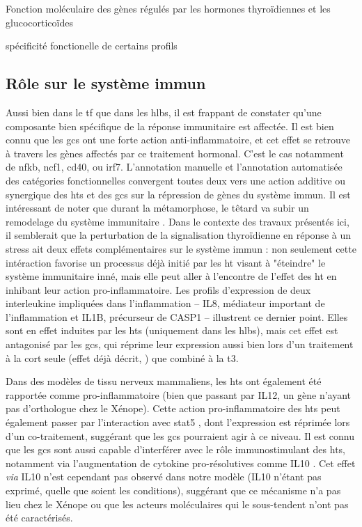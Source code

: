 \documentclass[../main.tex]{subfiles}
\begin{document}
\begin{chapter}{Fonction moléculaire des gènes régulés par les hormones thyroïdiennes et les glucocorticoïdes}
\begin{section}{spécificité fonctionelle de certains profils}
\subsection{Rôle sur le système immun}
Aussi bien dans le \gls{tf} que dans les \glspl{hlb}, il est frappant de constater qu'une composante bien spécifique de la réponse immunitaire est affectée.
Il est bien connu que les \glspl{gc} ont une forte action anti-inflammatoire, et cet effet se retrouve à travers les gènes affectés par ce traitement hormonal.
C'est le cas notamment de \gls{nfkb}, \gls{ncf1}, \gls{cd40}, ou \gls{irf7}.
L'annotation manuelle et l'annotation automatisée des catégories fonctionnelles convergent toutes deux vers une action additive ou synergique des \glspl{ht} et des \glspl{gc} sur la répression de gènes du système immun.
Il est intéressant de noter que durant la métamorphose, le têtard va subir un remodelage du système immunitaire .
Dans le contexte des travaux présentés ici, il semblerait que la perturbation de la signalisation thyroïdienne en réponse à un stress ait deux effets complémentaires sur le système immun :
non seulement cette intéraction favorise un processus déjà initié par les \gls{ht} visant à "éteindre" le système immunitaire inné, mais elle peut aller à l'encontre de l'effet des \gls{ht} en inhibant leur action pro-inflammatoire.
Les profils d'expression de deux interleukine impliquées dans l'inflammation – IL8, médiateur important de l'inflammation et IL1B, précurseur de CASP1 – illustrent ce dernier point.
Elles sont en effet induites par les \glspl{ht} (uniquement dans les \glspl{hlb}), mais cet effet est antagonisé par les \glspl{gc}, qui réprime leur expression aussi bien lors d'un traitement à la \gls{cort} seule (effet déjà décrit, \citealp{Nissen2000}) que combiné à la \gls{t3}.
\par
Dans des modèles de tissu nerveux mammaliens, les \glspl{ht} ont également été rapportée comme pro-inflammatoire \citep{Tamura1999,Montesinos2012} (bien que passant par IL12, un gène n'ayant pas d'orthologue chez le Xénope).
Cette action pro-inflammatoire des \glspl{ht} peut également passer par l’interaction avec \gls{stat5} \citep{Favre-Young2000}, dont l'expression est réprimée lors d'un co-traitement, suggérant que les \glspl{gc} pourraient agir à ce niveau.
Il est connu que les \glspl{gc} sont aussi capable d'interférer avec le rôle immunostimulant des \glspl{ht}, notamment via l'augmentation de cytokine pro-résolutives comme IL10 \citep{Montesinos2012}.
Cet effet \textit{via} IL10 n'est cependant pas observé dans notre modèle (IL10 n'étant pas exprimé, quelle que soient les conditions), suggérant que ce mécanisme n'a pas lieu chez le Xénope ou que les acteurs moléculaires qui le sous-tendent n'ont pas été caractérisés.

\end{section}
\end{chapter}
\end{document}
